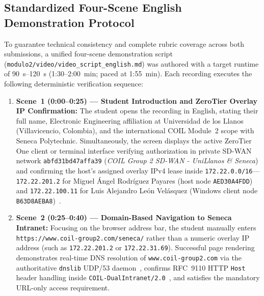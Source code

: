 \subsection{Standardized Four-Scene English Demonstration Protocol}
\label{subsec:video_protocol}

To guarantee technical consistency and complete rubric coverage across both submissions, a unified four-scene demonstration script (\texttt{modulo2/\allowbreak video/\allowbreak video\_script\_\allowbreak english.md}) was authored with a target runtime of \qtyrange{90}{120}{\second} (\mbox{1:30--2:00~min}; paced at \mbox{1:55~min}). Each recording executes the following deterministic verification sequence:

\begin{enumerate}
    \item \textbf{Scene~1 (0:00--0:25) --- Student Introduction and ZeroTier Overlay IP Confirmation:} The student opens the recording in English, stating their full name, Electronic Engineering affiliation at Universidad de los Llanos (Villavicencio, Colombia), and the international COIL Module~2 scope with Seneca Polytechnic. Simultaneously, the screen displays the active ZeroTier One client or terminal interface verifying authorization in private SD-WAN network \texttt{abfd31bd47affa39} (\textit{COIL Group 2 SD-WAN - UniLlanos \& Seneca}) and confirming the host's assigned overlay IPv4 lease inside \texttt{172.22.0.0/16}---\texttt{172.22.201.2} for Miguel \'{A}ngel Rodr\'{i}guez Payares (host node \texttt{AED30A4FDD}) and \texttt{172.22.100.11} for Luis Alejandro Le\'{o}n Vel\'{a}squez (Windows client node \texttt{B63D8AEBA8})~\cite{zerotier2024}.

    \item \textbf{Scene~2 (0:25--0:40) --- Domain-Based Navigation to Seneca Intranet:} Focusing on the browser address bar, the student manually enters \texttt{https://\allowbreak www.coil-group2.com/\allowbreak seneca/} rather than a numeric overlay IP address (such as \texttt{172.22.201.2} or \texttt{172.22.31.69}). Successful page rendering demonstrates real-time DNS resolution of \texttt{www.coil-group2.com} via the authoritative \texttt{dnslib} UDP/53 daemon~\cite{rfc1035}, confirms RFC~9110 HTTP \texttt{Host} header handling inside \texttt{COIL-DualIntranet/2.0}~\cite{rfc9110}, and satisfies the mandatory URL-only access requirement.


\end{enumerate}
